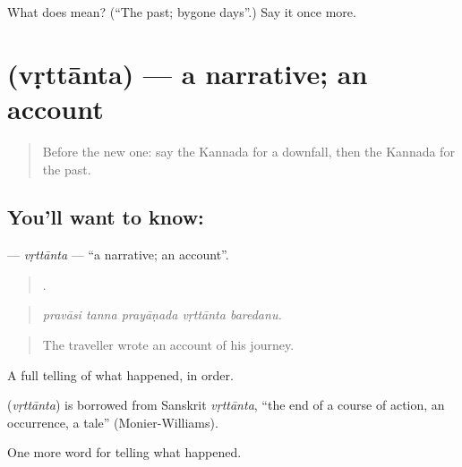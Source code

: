 \begin{tcolorbox}[breakable,colback=teal!4,colframe=teal!35!black,title={Before you move on}]
What does  mean? (\textquotedblleft{}The past; bygone days\textquotedblright{}.) Say it once more.
\end{tcolorbox}
\section[\texorpdfstring{\kn{ವೃತ್ತಾಂತ} (vṛttānta)}{ವೃತ್ತಾಂತ (vṛttānta)}]{ (vṛttānta) — a narrative; an account}

\label{lesson:KA-C373-vrttanta}



\begin{quote}
Before the new one: say the Kannada for a downfall, then the Kannada for the past.
\end{quote}

\subsection*{You'll want to know: }
\textbf{} — \emph{vṛttānta} — \textquotedblleft{}a narrative; an account\textquotedblright{}.

\begin{quote}
    .
\end{quote}

\begin{quote}
\emph{pravāsi tanna prayāṇada vṛttānta baredanu.}
\end{quote}

\begin{quote}
The traveller wrote an account of his journey.
\end{quote}

A full telling of what happened, in order.

\begin{cousinweb}
\textbf{} (\emph{vṛttānta}) is borrowed from Sanskrit \emph{vṛttānta}, \textquotedblleft{}the end of a course of action, an occurrence, a tale\textquotedblright{} (Monier-Williams).
\end{cousinweb}

\begin{grammarlens}[title={What you've built}]
One more word for telling what happened.
\end{grammarlens}

